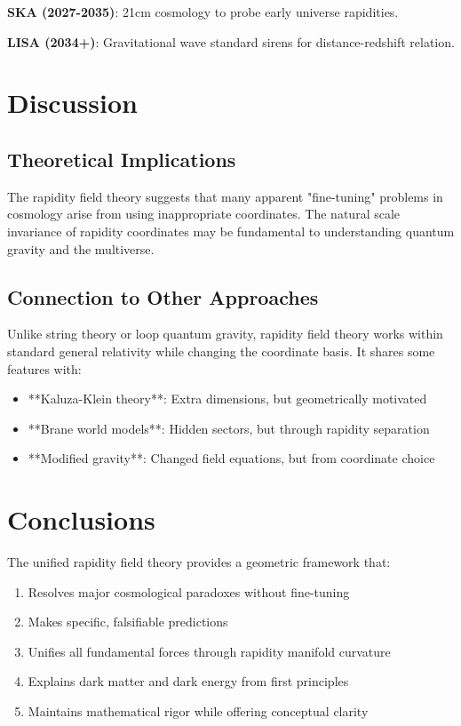 \documentclass[12pt,a4paper]{article}
\begin{document}
\textbf{SKA (2027-2035)}: 21cm cosmology to probe early universe rapidities.

\textbf{LISA (2034+)}: Gravitational wave standard sirens for distance-redshift relation.

\section{Discussion}

\subsection{Theoretical Implications}

The rapidity field theory suggests that many apparent "fine-tuning" problems in cosmology arise from using inappropriate coordinates. The natural scale invariance of rapidity coordinates may be fundamental to understanding quantum gravity and the multiverse.

\subsection{Connection to Other Approaches}

Unlike string theory or loop quantum gravity, rapidity field theory works within standard general relativity while changing the coordinate basis. It shares some features with:
\begin{itemize}
\item **Kaluza-Klein theory**: Extra dimensions, but geometrically motivated
\item **Brane world models**: Hidden sectors, but through rapidity separation
\item **Modified gravity**: Changed field equations, but from coordinate choice
\end{itemize}

\section{Conclusions}

The unified rapidity field theory provides a geometric framework that:

\begin{enumerate}
\item Resolves major cosmological paradoxes without fine-tuning
\item Makes specific, falsifiable predictions
\item Unifies all fundamental forces through rapidity manifold curvature
\item Explains dark matter and dark energy from first principles
\item Maintains mathematical rigor while offering conceptual clarity
\end{enumerate}
\end{document}

